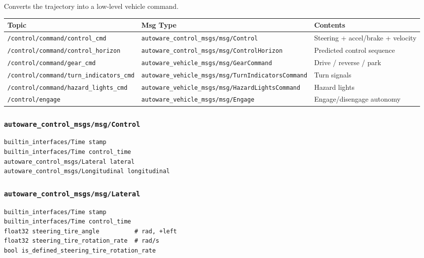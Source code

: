 \documentclass[
]{article}
\begin{document}
Converts the trajectory into a low-level vehicle command.

\begin{longtable}[]{@{}lll@{}}
\toprule\noalign{}
Topic & Msg Type & Contents \\
\midrule\noalign{}
\endhead
\bottomrule\noalign{}
\endlastfoot
\texttt{/control/command/control\_cmd} &
\texttt{autoware\_control\_msgs/msg/Control} & Steering + accel/brake +
velocity \\
\texttt{/control/command/control\_horizon} &
\texttt{autoware\_control\_msgs/msg/ControlHorizon} & Predicted control
sequence \\
\texttt{/control/command/gear\_cmd} &
\texttt{autoware\_vehicle\_msgs/msg/GearCommand} & Drive / reverse /
park \\
\texttt{/control/command/turn\_indicators\_cmd} &
\texttt{autoware\_vehicle\_msgs/msg/TurnIndicatorsCommand} & Turn
signals \\
\texttt{/control/command/hazard\_lights\_cmd} &
\texttt{autoware\_vehicle\_msgs/msg/HazardLightsCommand} & Hazard
lights \\
\texttt{/control/engage} & \texttt{autoware\_vehicle\_msgs/msg/Engage} &
Engage/disengage autonomy \\
\end{longtable}

\subsubsection{\texorpdfstring{\texttt{autoware\_control\_msgs/msg/Control}}{autoware\_control\_msgs/msg/Control}}\label{autoware_control_msgsmsgcontrol}

\begin{verbatim}
builtin_interfaces/Time stamp
builtin_interfaces/Time control_time
autoware_control_msgs/Lateral lateral
autoware_control_msgs/Longitudinal longitudinal
\end{verbatim}

\subsubsection{\texorpdfstring{\texttt{autoware\_control\_msgs/msg/Lateral}}{autoware\_control\_msgs/msg/Lateral}}\label{autoware_control_msgsmsglateral}

\begin{verbatim}
builtin_interfaces/Time stamp
builtin_interfaces/Time control_time
float32 steering_tire_angle          # rad, +left
float32 steering_tire_rotation_rate  # rad/s
bool is_defined_steering_tire_rotation_rate
\end{verbatim}
\end{document}
